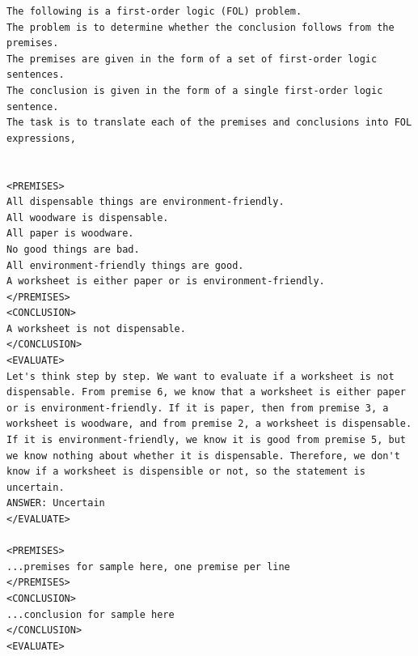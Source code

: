 \begin{lstlisting}[breaklines=true]
The following is a first-order logic (FOL) problem.
The problem is to determine whether the conclusion follows from the premises.
The premises are given in the form of a set of first-order logic sentences.
The conclusion is given in the form of a single first-order logic sentence.
The task is to translate each of the premises and conclusions into FOL expressions, 


<PREMISES>
All dispensable things are environment-friendly.
All woodware is dispensable.
All paper is woodware.
No good things are bad.
All environment-friendly things are good.
A worksheet is either paper or is environment-friendly.
</PREMISES>
<CONCLUSION>
A worksheet is not dispensable.
</CONCLUSION>
<EVALUATE>
Let's think step by step. We want to evaluate if a worksheet is not dispensable. From premise 6, we know that a worksheet is either paper or is environment-friendly. If it is paper, then from premise 3, a worksheet is woodware, and from premise 2, a worksheet is dispensable. If it is environment-friendly, we know it is good from premise 5, but we know nothing about whether it is dispensable. Therefore, we don't know if a worksheet is dispensible or not, so the statement is uncertain.
ANSWER:	Uncertain
</EVALUATE>

<PREMISES>
...premises for sample here, one premise per line
</PREMISES>
<CONCLUSION>
...conclusion for sample here
</CONCLUSION>
<EVALUATE>
\end{lstlisting}

